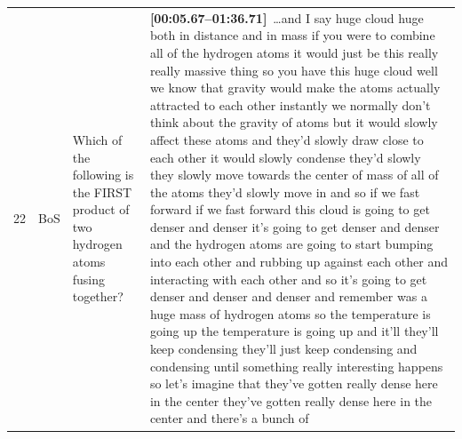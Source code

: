 \documentclass[10pt]{article}
\begin{document}
\begin{tiny}
\begin{longtable}{r p{0.3in} p{1.212in} p{3.8in}}
    22 &          BoS &                                                                                                                                                                                               Which of the following is the FIRST product of two hydrogen atoms fusing together? &                                                                                                                                                                                                                                                                                                                                                                                                                                                                                                                                                                                                                                                                                                                                                                                                                                                                                                                                                                                                                                                                                                                                                                                                                                                                                                                                                                                                                                                                                                                                                                                                                                                                                                                                                                                                \textbf{[00:05.67--01:36.71]}~\ldots and I say huge cloud huge both in distance and in mass if you were to combine all of the hydrogen atoms it would just be this really really massive thing so you have this huge cloud well we know that gravity would make the atoms actually attracted to each other instantly we normally don't think about the gravity of atoms but it would slowly affect these atoms and they'd slowly draw close to each other it would slowly condense they'd slowly they slowly move towards the center of mass of all of the atoms they'd slowly move in and so if we fast forward if we fast forward this cloud is going to get denser and denser it's going to get denser and denser and the hydrogen atoms are going to start bumping into each other and rubbing up against each other and interacting with each other and so it's going to get denser and denser and denser and remember was a huge mass of hydrogen atoms so the temperature is going up the temperature is going up and it'll they'll keep condensing they'll just keep condensing and condensing until something really interesting happens so let's imagine that they've gotten really dense here in the center they've gotten really dense here in the center and there's a bunch of 
\end{longtable}
\end{tiny}
\end{document}
